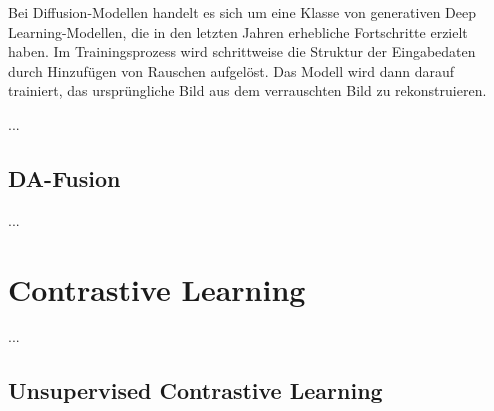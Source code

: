 Bei Diffusion-Modellen handelt es sich um eine Klasse von generativen Deep Learning-Modellen, die in den letzten Jahren erhebliche Fortschritte erzielt haben. Im Trainingsprozess wird schrittweise die Struktur der Eingabedaten durch Hinzufügen von Rauschen aufgelöst. Das Modell wird dann darauf trainiert, das ursprüngliche Bild aus dem verrauschten Bild zu rekonstruieren.

...

\subsection{DA-Fusion}

...

\section{Contrastive Learning}


...

\subsection{Unsupervised Contrastive Learning}


